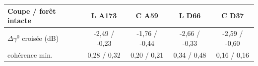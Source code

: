 \begin{tabular}{lcccc}
\toprule
Coupe / forêt intacte & L A173 & C A59 & L D66 & C D37 \\
\midrule
$\Delta\gamma^0$ croisée (dB) & -2{,}49 / -0{,}23 & -1{,}76 / -0{,}44 & -2{,}66 / -0{,}33 & -2{,}59 / -0{,}60 \\
cohérence min. & 0{,}28 / 0{,}32 & 0{,}20 / 0{,}21 & 0{,}34 / 0{,}48 & 0{,}16 / 0{,}16 \\
\bottomrule
\end{tabular}
